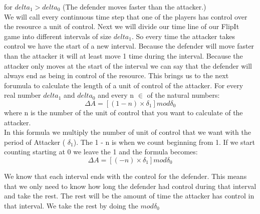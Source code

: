 %
%


for $delta_{1} > delta_{0}$ (The defender moves faster than the attacker.) \\

We will call every continuous time step that one of the players has control over the resource a unit of control. 
Next we will divide our time line of our FlipIt game into different intervals of size $delta_{1}$. So every time the attacker takes control we have the start of a new interval. Because the defender will move faster than the attacker it will at least move 1 time during the interval. Because the attacker only moves at the start of the interval we can say that the defender will always end as being in control of the resource. This brings us to the next forumula to calculate the length of a unit of control of the attacker. 
For every real number $delta_{1}$ and $delta_{0}$ and every n $\in$ of the natural numbers:
\begin{equation}\label{first}
\Delta A = [( 1- n  ) \times \delta_{1}] mod \delta_{0}
\end{equation}
where n is the number of the unit of control that you want to calculate of the attacker.\\

In this formula we multiply the number of unit of control that we want with the period of Attacker ( $\delta_{1}$). The 1 - n is when we count beginning from 1. If we start counting starting at 0 we leave the 1 and the formula becomes:
\begin{equation}\label{first}
\Delta A = [( - n  ) \times \delta_{1}] mod \delta_{0}
\end{equation}

We know that each interval ends with the control for the defender. This means that we only need to know how long the defender had control during that interval and take the rest. The rest will be the amount of time the attacker has control in that interval. We take the rest by doing the $mod \delta_{0} $

